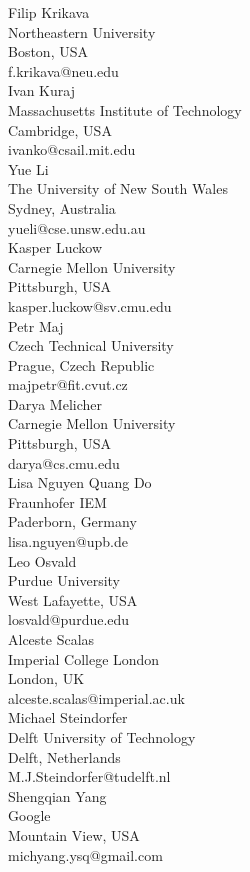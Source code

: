 \documentclass[a4paper,UKenglish]{dartsmaster}
\begin{document}
\begin{participants}
\participant Filip Krikava\\
  Northeastern University\\
  Boston, USA\\
  f.krikava@neu.edu\\

\participant Ivan Kuraj\\
  Massachusetts Institute of Technology\\
  Cambridge, USA\\
  ivanko@csail.mit.edu\\

\participant Yue Li\\
  The University of New South Wales\\
  Sydney, Australia\\
  yueli@cse.unsw.edu.au\\

\participant Kasper Luckow\\
  Carnegie Mellon University\\
  Pittsburgh, USA\\
  kasper.luckow@sv.cmu.edu\\

\participant Petr Maj\\
  Czech Technical University\\
  Prague, Czech Republic\\
  majpetr@fit.cvut.cz\\

\participant Darya Melicher\\
  Carnegie Mellon University\\
  Pittsburgh, USA\\
  darya@cs.cmu.edu\\

\participant Lisa Nguyen Quang Do\\
  Fraunhofer IEM\\
  Paderborn, Germany\\
  lisa.nguyen@upb.de\\

\participant Leo Osvald\\
  Purdue University\\
  West Lafayette, USA\\
  losvald@purdue.edu\\

\participant Alceste Scalas\\
  Imperial College London\\
  London, UK\\
  alceste.scalas@imperial.ac.uk\\

\participant Michael Steindorfer\\
  Delft University of Technology\\
  Delft, Netherlands\\
  M.J.Steindorfer@tudelft.nl\\

\participant Shengqian Yang\\
  Google\\
  Mountain View, USA\\
  michyang.ysq@gmail.com\\

\end{participants} 
\end{document}
